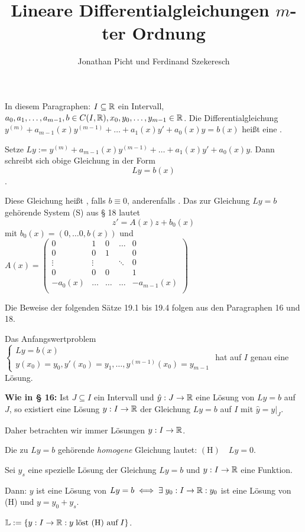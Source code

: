 \documentclass{article}
\title{Lineare Differentialgleichungen $m$-ter Ordnung}
\author{Jonathan Picht und Ferdinand Szekeresch}
\begin{document}
\maketitle

In diesem Paragraphen: $I \subseteq \mathbb{R}$ ein Intervall, $a_0, a_1, \ldots,
a_{m-1}, b \in C(I,\mathbb{R}), x_0, y_0, \ldots, y_{m-1} \in \mathbb{R}$. Die
Differentialgleichung $y^{(m)} + a_{m-1}(x)y^{(m-1)} + \ldots + a_1(x)y' +
a_0(x)y = b(x)$ heißt eine .

Setze $Ly:= y^{(m)} + a_{m-1}(x)y^{(m-1)} + \ldots + a_1(x)y' + a_0(x)y$. Dann schreibt sich obige Gleichung in der Form
$$Ly = b(x)$$.

Diese Gleichung heißt , falls $b\equiv 0$, anderenfalls .
Das zur Gleichung $Ly=b$ gehörende System (S) aus § 18 lautet
$$z'=A(x)z+b_0(x)$$
mit $b_0(x) = (0, \ldots 0, b(x))$ und $A(x) =\begin{pmatrix}
0 & 1 & 0 & \ldots & 0\\
0 & 0 & 1 & & 0\\
\vdots & \vdots & & \ddots & 0\\
0 & 0 & 0 & & 1\\
-a_0(x) & \ldots & \ldots & \ldots & -a_{m-1}(x)\\
\end{pmatrix}$

Die Beweise der folgenden Sätze 19.1 bis 19.4 folgen aus den Paragraphen 16 und 18.

\begin{satz} %
Das Anfangswertproblem $\begin{cases}Ly=b(x)\\y(x_0)=y_0, y'(x_0)=y_1, \ldots, y^{(m-1)}(x_0)=y_{m-1}\end{cases}$ hat auf $I$ genau eine Lösung.
\end{satz}

{\bf Wie in § 16:} Ist $J \subseteq I$ ein Intervall und $\hat{y}:J\rightarrow \mathbb{R}$
eine Lösung von $Ly=b$ auf $J$, so existiert eine Lösung $y:I\rightarrow \mathbb{R}$
der Gleichung $Ly=b$ auf $I$ mit $\hat{y}=y|_J$.

Daher betrachten wir immer Lösungen $y:I\rightarrow \mathbb{R}$.

Die zu $Ly=b$ gehörende \emph{homogene} Gleichung lautet: $(\text{H})\quad Ly=0$.

\begin{satz} %
Sei $y_s$ eine spezielle Lösung der Gleichung $Ly=b$ und $y:I\rightarrow \mathbb{R}$ eine Funktion.

Dann: $y$ ist eine Lösung von $Ly=b \iff \exists \; y_0:I\rightarrow \mathbb{R}: y_0$ ist eine Lösung von (H) und $y = y_0 + y_s$.

$\mathbb{L} := \{ y:I\rightarrow \mathbb{R}: y\; \text{löst (H) auf}\; I \}$.
\end{satz}
\end{document}

